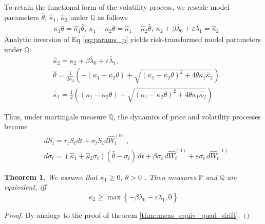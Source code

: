 \documentclass[11pt,a4paper] {article}
\newtheorem{theorem}{Theorem}[section]
\begin{document}
To retain the functional form of the volatility process, we rescale model parameters $\hat\theta$, $\hat\kappa_1$, $\hat\kappa_2$ under $\mathbb{Q}$ as follows
\begin{equation}\label{eq:params_p}
\begin{split}
&\kappa_1\theta=\hat\kappa_1\hat\theta, \ \kappa_1-\kappa_2\theta=\hat\kappa_1-\hat\kappa_2\hat\theta, \ \kappa_2+\beta\bar\lambda_0+\varepsilon\bar\lambda_1=\hat\kappa_2
\end{split}
\end{equation}
Analytic inversion of Eq \eqref{eq:params_p} yields risk-transformed model parameters under $\mathbb{Q}$:
\begin{equation}
\begin{split}
& \hat\kappa_2 = \kappa_2+\beta\bar\lambda_0+\varepsilon\bar\lambda_1,\\
& \hat \theta =  \frac{1}{2\hat\kappa_2}\left( - (\kappa_1-\kappa_2\theta) + \sqrt{(\kappa_1-\kappa_2\theta)^{2}+4\theta\kappa_{1}\hat\kappa_2} \right)\\
& \hat \kappa_1 = \frac{1}{2} \left( (\kappa_1-\kappa_2\theta) +  \sqrt{(\kappa_1-\kappa_2\theta)^{2}+4\theta\kappa_{1}\hat\kappa_2} \right)
\end{split}
\end{equation}


Thus, under martingale measure $\mathbb{Q}$, the dynamics of  price and volatility processes become
\begin{equation}\label{eq:dynam_Q2}
\begin{split}
&dS_t= r_t S_tdt + \sigma_t S_t d\hat{W}^{(0)}_t,\\
&d\sigma_t=(\hat\kappa_1+\hat\kappa_2\sigma_t)(\hat\theta-\sigma_t)\,dt+\beta\sigma_t\,d\hat{W}^{(0)}_t+\varepsilon\sigma_t\,d\hat{W}^{(1)}_t
\end{split}
\end{equation}

\begin{theorem}\label{prop:meas_equiv_logsv_quadrift}
We assume that $\kappa_1\ge 0$, $\theta>0$ . Then measures $\mathbb{P}$ and $\mathbb{Q}$ are equivalent, iff
\begin{equation}
\kappa_2\ge \max \left\{ -\beta\bar\lambda_0-\varepsilon\bar\lambda_1, 0 \right\}
\end{equation}
\end{theorem}

\begin{proof}
By analogy to the proof of theorem \ref{thm::meas_equiv_quad_drift}.
\end{proof}
\end{document}
